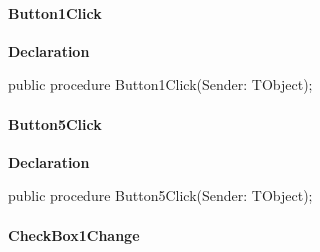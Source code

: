 \documentclass{report}
\newif\ifpdf
\begin{document}
\paragraph*{Button1Click}\hspace*{\fill}

\label{mainunit.TIWizFrm-Button1Click}
\begin{list}{}{
\setlength{\itemindent}{0cm}
\setlength{\listparindent}{0cm}
\setlength{\leftmargin}{\evensidemargin}
\addtolength{\leftmargin}{\tmplength}
\settowidth{\labelsep}{X}
\addtolength{\leftmargin}{\labelsep}
\setlength{\labelwidth}{\tmplength}
}
\item[\textbf{Declaration}\hfill]
\ifpdf
\begin{flushleft}
\fi
\begin{ttfamily}
public procedure Button1Click(Sender: TObject);\end{ttfamily}

\ifpdf
\end{flushleft}
\fi

\end{list}
\paragraph*{Button5Click}\hspace*{\fill}

\label{mainunit.TIWizFrm-Button5Click}
\begin{list}{}{
\setlength{\itemindent}{0cm}
\setlength{\listparindent}{0cm}
\setlength{\leftmargin}{\evensidemargin}
\addtolength{\leftmargin}{\tmplength}
\settowidth{\labelsep}{X}
\addtolength{\leftmargin}{\labelsep}
\setlength{\labelwidth}{\tmplength}
}
\item[\textbf{Declaration}\hfill]
\ifpdf
\begin{flushleft}
\fi
\begin{ttfamily}
public procedure Button5Click(Sender: TObject);\end{ttfamily}

\ifpdf
\end{flushleft}
\fi

\end{list}
\paragraph*{CheckBox1Change}\hspace*{\fill}
\end{document}
